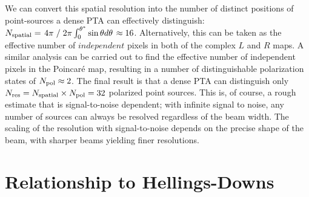 \documentclass[%
 reprint,
nofootinbib,
 amsmath,amssymb,
 aps,
]{revtex4-2}
\begin{document}
We can convert this spatial resolution into the number of distinct
positions of point-sources a dense PTA can effectively distinguish:
$N_{\rm spatial} = \left. 4 \pi \right. / \left. 2 \pi \int_0^{\theta^*} \sin\theta
  d\theta \right. \approx 16$. Alternatively, this can be taken as the
effective number of $\textit{independent}$ pixels in both of the
complex $L$ and $R$ maps. A similar analysis can be carried out to
find the effective number of independent pixels in the Poincar\'e map,
resulting in a number of distinguishable polarization states of
$N_{\rm pol} \approx 2$. The final result is that a dense PTA can
distinguish only $N_{\rm res} = N_{\rm spatial} \times N_{\rm pol} =
32$ polarized point sources. This is, of course, a rough estimate that
is signal-to-noise dependent; with infinite signal to noise, any
number of sources can always be resolved regardless of the beam
width. The scaling of the resolution with signal-to-noise depends on
the precise shape of the beam, with sharper beams yielding finer
resolutions.   

\section{\label{sec:HD}Relationship to Hellings-Downs}
\end{document}
